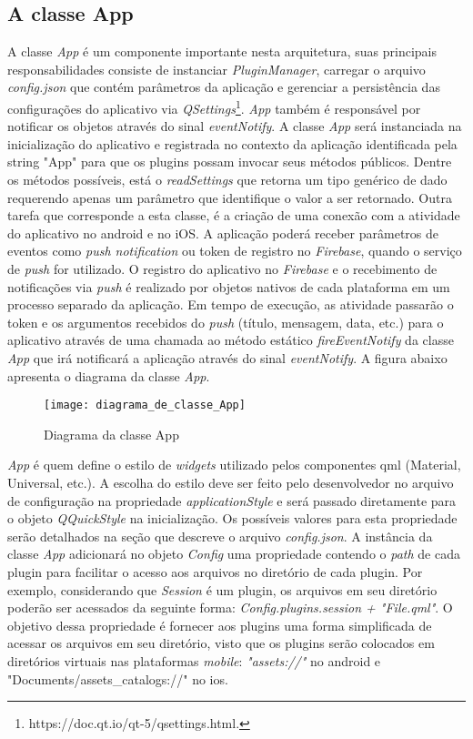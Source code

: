 \subsection{A classe App}\label{sec:solucao-desenvolvida}
A classe \textit{App} é um componente importante nesta arquitetura, suas principais responsabilidades consiste de instanciar \textit{PluginManager}, carregar o arquivo \textit{config.json} que contém parâmetros da aplicação e gerenciar a persistência das configurações do aplicativo via \textit{QSettings}\footnote{https://doc.qt.io/qt-5/qsettings.html.}. \textit{App} também é responsável por notificar os objetos através do sinal \textit{eventNotify}. A classe \textit{App} será instanciada na inicialização do aplicativo e registrada no contexto da aplicação identificada pela string "App" para que os plugins possam invocar seus métodos públicos. Dentre os métodos possíveis, está o \textit{readSettings} que retorna um tipo genérico de dado requerendo apenas um parâmetro que identifique o valor a ser retornado. Outra tarefa que corresponde a esta classe, é a criação de uma conexão com a atividade do aplicativo no android e no iOS. A aplicação poderá receber parâmetros de eventos como \textit{push notification} ou token de registro no \textit{Firebase}, quando o serviço de \textit{push} for utilizado. O registro do aplicativo no \textit{Firebase} e o recebimento de notificações via \textit{push} é realizado por objetos nativos de cada plataforma em um processo separado da aplicação. Em tempo de execução, as atividade passarão o token e os argumentos recebidos do \textit{push} (título, mensagem, data, etc.) para o aplicativo através de uma chamada ao método estático \textit{fireEventNotify} da classe \textit{App} que irá notificará a aplicação através do sinal \textit{eventNotify}. A figura abaixo apresenta o diagrama da classe \textit{App}.

\begin{figure}[H]
	\texttt{[image: diagrama\_de\_classe\_App]}
	\centering
	\caption{Diagrama da classe App}
\end{figure}

\textit{App} é quem define o estilo de \textit{widgets} utilizado pelos componentes qml (Material, Universal, etc.). A escolha do estilo deve ser feito pelo desenvolvedor no arquivo de configuração na propriedade \textit{applicationStyle} e será passado diretamente para o objeto \textit{QQuickStyle} na inicialização. Os possíveis valores para esta propriedade serão detalhados na seção que descreve o arquivo \textit{config.json}. A instância da classe \textit{App} adicionará no objeto \textit{Config} uma propriedade contendo o \textit{path} de cada plugin para facilitar o acesso aos arquivos no diretório de cada plugin. Por exemplo, considerando que \textit{Session} é um plugin, os arquivos em seu diretório poderão ser acessados da seguinte forma: \textit{Config.plugins.session + "File.qml"}. O objetivo dessa propriedade é fornecer aos plugins uma forma simplificada de acessar os arquivos em seu diretório, visto que os plugins serão colocados em diretórios virtuais nas plataformas \textit{mobile}: \textit{"assets://"} no android e "Documents/assets\_catalogs://" no ios.


